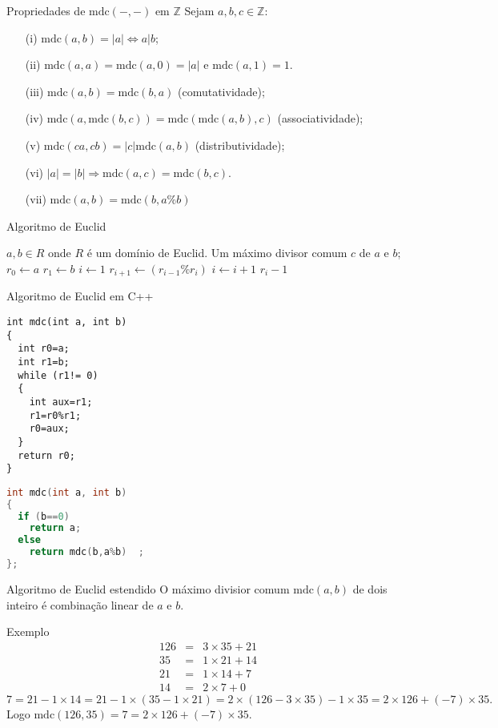 \documentclass[handout]{beamer}
\newcommand{\ZZ}{\mathbb Z}
\newcommand{\mdc}[2]{\mathrm{mdc}({#1}, {#2})}
\begin{document}
\begin{frame}
\begin{block}{Propriedades de $\mdc{-}{-}$ em $\ZZ$} Sejam $a,b,c \in \ZZ$: 
\begin{enumerate}
\item[(i)] $\mdc{a}{b}=|a| \Longleftrightarrow a | b$;
\item[(ii)] $\mdc{a}{a}=\mdc{a}{0}=|a|$ e $\mdc{a}{1}=1$.
\item[(iii)] $\mdc{a}{b}=\mdc{b}{a}$ (comutatividade);
\item[(iv)] $\mdc{a}{\mdc{b}{c}} = \mdc{\mdc{a}{b}}{c}$ (associatividade);
\item[(v)]  $\mdc{ca}{cb} = |c|\mdc{a}{b}$ (distributividade);
\item[(vi)] $|a|=|b| \Rightarrow \mdc{a}{c}=\mdc{b}{c}$.
\item[(vii)] $\mdc{a}{b} = \mdc{b}{a\%b}$
\end{enumerate}
\end{block}
\end{frame}

\begin{frame}[fragile]{Algoritmo de Euclid}
\begin{algorithmic}
\REQUIRE $a,b \in R$ onde $R$ é um domínio de Euclid.
\ENSURE Um máximo divisor comum $c$ de $a$ e $b$;
	\STATE $r_0 \leftarrow a$
	\STATE $r_1 \leftarrow b$
	\STATE $i \leftarrow 1$
		\STATE $r_{i+1}\leftarrow (r_{i-1}\% r_i)$
		\STATE $i\leftarrow i+1$
	\ENDWHILE
	\RETURN $r_i-1$
\end{algorithmic}

\end{frame}


\begin{frame}[fragile]{Algoritmo de Euclid em C++}
\lstset{language=C++,basicstyle=\tiny}
\begin{lstlisting}
int mdc(int a, int b)
{
  int r0=a;
  int r1=b;
  while (r1!= 0)
  {
    int aux=r1;
    r1=r0%r1;
    r0=aux; 
  }
  return r0;
}
\end{lstlisting}
\pause

\begin{lstlisting}[language=C++]
int mdc(int a, int b)
{
  if (b==0) 
    return a;
  else 
    return mdc(b,a%b)  ;
};
\end{lstlisting}
\end{frame}


\begin{frame}{Algoritmo de Euclid estendido}
O máximo divisior comum $\mdc{a}{b}$ de dois inteiro é combinação linear de $a$ e $b$.
\begin{block}{Exemplo}
\begin{eqnarray*}
126 &=& 3\times 35 + 21 \\
35 &=& 1\times 21 + 14 \\
21 &=& 1 \times 14 + 7\\
14 &=& 2\times 7 + 0
\end{eqnarray*}
{\tiny $$7 = 21 - 1\times 14 = 21 - 1\times (35 - 1\times 21) = 2\times (126 - 3\times 35) - 1\times 35 = 2\times 126 + (-7)\times 35.$$}
Logo $\mdc{126}{35} = 7 = 2\times 126 + (-7)\times 35$.
\end{block}
\end{frame}
\end{document}
